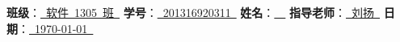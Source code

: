 \newcommand{\ctli}[2]{{\bf #1}：\underline{{~#2~}}\hfill}

\begin{center}

{\bfseries{}}

\vspace*{1em}

{\small
\ctli{班级}{软件~1305~班}
\ctli{学号}{201316920311}
\ctli{姓名}{\tjf}
\ctli{指导老师}{刘扬}
\ctli{日期}{\today}
}

\end{center}

\part{\titlec}

